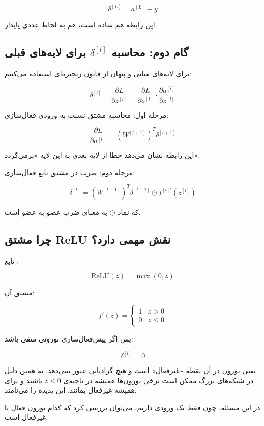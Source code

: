 \documentclass{article}
\begin{document}
\[
\delta^{[L]} = a^{[L]} - y
\]

این رابطه هم ساده است، هم به لحاظ عددی پایدار.

\subsection*{گام دوم: محاسبه \(\delta^{[l]}\) برای لایه‌های قبلی}

برای لایه‌های میانی و پنهان از قانون زنجیره‌ای استفاده می‌کنیم:

\[
\delta^{[l]} = 
\frac{\partial L}{\partial z^{[l]}} 
=
\frac{\partial L}{\partial a^{[l]}}
\cdot
\frac{\partial a^{[l]}}{\partial z^{[l]}}
\]

مرحله اول: محاسبه مشتق نسبت به ورودی فعال‌سازی:

\[
\frac{\partial L}{\partial a^{[l]}}
=
(W^{[l+1]})^T \delta^{[l+1]}
\]

این رابطه نشان می‌دهد خطا از لایه بعدی به این لایه «برمی‌گردد».

مرحله دوم: ضرب در مشتق تابع فعال‌سازی:

\[
\delta^{[l]} =
(W^{[l+1]})^T \delta^{[l+1]} 
\odot f^{[l]'}(z^{[l]})
\]

که نماد \(\odot\) به معنای ضرب عضو به عضو است.

\subsection*{چرا مشتق ReLU نقش مهمی دارد؟}

تابع :

\[
\text{ReLU}(z) = \max(0,z)
\]

مشتق آن:

\[
f'(z) =
\begin{cases}
	1 & z > 0 \\
	0 & z \le 0
\end{cases}
\]

پس اگر پیش‌فعال‌سازی نورونی منفی باشد:

\[
\delta^{[l]} = 0
\]

یعنی نورون در آن نقطه «غیرفعال» است و هیچ گرادیانی عبور نمی‌دهد.  
به همین دلیل در شبکه‌های بزرگ ممکن است برخی نورون‌ها همیشه در ناحیه‌ی \(z \le 0\) باشند و برای همیشه غیرفعال بمانند.  
این پدیده را  می‌نامند.

در این مسئله، چون فقط یک ورودی داریم، می‌توان بررسی کرد که کدام نورون فعال یا غیرفعال است.
\end{document}
